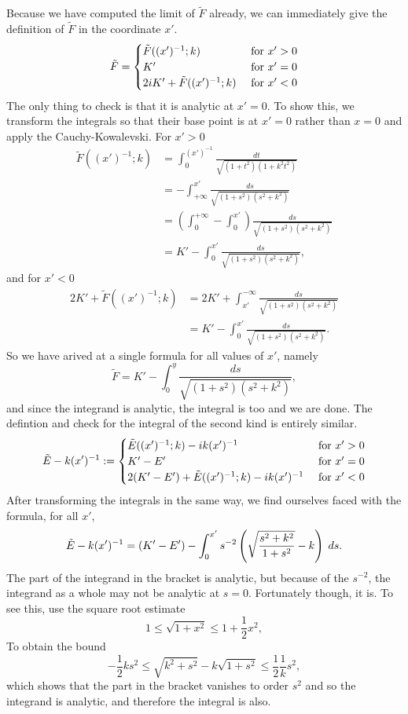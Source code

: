 Because we have computed the limit of $\tilde{F}$ already, we can immediately give the definition of $\tilde{F}$ in the coordinate $x'$.
\[
\tilde{F} =
\begin{cases}
\tilde F((x')^{-1}; k)             & \text{ for } x' > 0 \\
K'                              & \text{ for } x' = 0 \\
2i K' + \tilde F((x')^{-1}; k)   & \text{ for } x' < 0
\end{cases}
\]
The only thing to check is that it is analytic at $x'=0$. To show this, we transform the integrals so that their base point is at $x'=0$ rather than $x=0$ and apply the Cauchy-Kowalevski. For $x'>0$
\begin{align*}
\tilde F( (x')^{-1}; k)
&= \int_0^{(x')^{-1}} \frac{dt}{\sqrt{(1+t^2)(1+k^2t^2)}} \\
&= - \int_{+\infty}^{x'} \frac{ds}{\sqrt{(1+s^2)(s^2+k^2)}} \\
&= \left(\int_0^{+\infty} - \int_0^{x'} \right) \frac{ds}{\sqrt{(1+s^2)(s^2+k^2)}} \\
&= K' - \int_0^{x'} \frac{ds}{\sqrt{(1+s^2)(s^2+k^2)}},
\end{align*}
and for $x' < 0$
\begin{align*}
2 K' + \tilde F((x')^{-1}; k)
&= 2 K' + \int_{x'}^{-\infty} \frac{ds}{\sqrt{(1+s^2)(s^2+k^2)}} \\
&=  K' - \int_0^{x'} \frac{ds}{\sqrt{(1+s^2)(s^2+k^2)}}.
\end{align*}
So we have arived at a single formula for all values of $x'$, namely
\[
\tilde{F} = K' - \int_0^y \frac{ds}{\sqrt{(1+s^2)(s^2+k^2)}},
\]
and since the integrand is analytic, the integral is too and we are done. The defintion and check for the integral of the second kind is entirely similar.
\[
\tilde{E} - k(x')^{-1} :=
\begin{cases}
\tilde E((x')^{-1}; k) - i k(x')^{-1}                 & \text{ for } x' > 0 \\
K'-E'                                                   & \text{ for } x' = 0 \\
2(K'-E') + \tilde E((x')^{-1}; k)  - i k(x')^{-1}     & \text{ for } x' < 0
\end{cases}
\]
After transforming the integrals in the same way, we find ourselves faced with the formula, for all $x'$,
\[
\tilde{E} - k(x')^{-1} = (K'-E') - \int_0^{x'} s^{-2}\left( \sqrt{\frac{s^2 + k^2}{1 + s^2}} - k \right)\;ds.
\]
The part of the integrand in the bracket is analytic, but because of the $s^{-2}$, the integrand as a whole may not be analytic at $s=0$. Fortunately though, it is. To see this, use the square root estimate
\[
1 \leq \sqrt {1 + x^2} \leq 1 + \frac{1}{2}x^2,
\]
To obtain the bound
\[
-\frac{1}{2}k s^2 \leq \sqrt{k^2 + s^2} - k \sqrt{1+s^2} \leq \frac{1}{2}\frac{1}{k} s^2,
\]
which shows that the part in the bracket vanishes to order $s^2$ and so the integrand is analytic, and therefore the integral is also.

